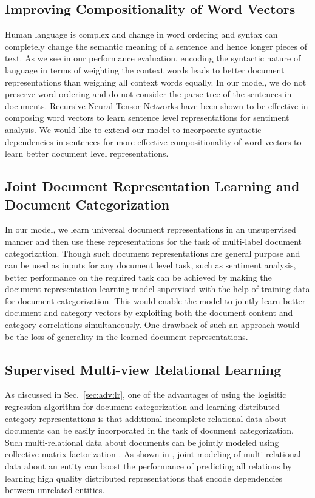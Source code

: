 \subsection{Improving Compositionality of Word Vectors}
Human language is complex and change in word ordering and syntax can completely change the semantic meaning of a sentence and hence longer pieces of text. 
As we see in our performance evaluation, encoding the syntactic nature of language in terms of weighting the context words leads to better document representations than weighing all context words equally. 
In our model, we do not preserve word ordering and do not consider the parse tree of the sentences in documents. 
Recursive Neural Tensor Networks \citep{socher2013recursive} have been shown to be effective in composing word vectors to learn sentence level representations for sentiment analysis. 
We would like to extend our model to incorporate syntactic dependencies in sentences for more effective compositionality of word vectors to learn better document level representations.

\subsection{Joint Document Representation Learning and Document Categorization}
In our model, we learn universal document representations in an unsupervised manner and then use these representations for the task of multi-label document categorization. 
Though such document representations are general purpose and can be used as inputs for any document level task, such as sentiment analysis, better performance on the required task can be achieved by making the document representation learning model supervised with the help of training data for document categorization. 
This would enable the model to jointly learn better document and category vectors by exploiting both the document content and category correlations simultaneously.
One drawback of such an approach would be the loss of generality in the learned document representations.

\subsection{Supervised Multi-view Relational Learning}
As discussed in Sec.~\ref{sec:adv:lr}, one of the advantages of using the logisitic regression algorithm for document categorization and learning distributed category representations is that additional incomplete-relational data about documents can be easily incorporated in the task of document categorization. Such multi-relational data about documents can be jointly modeled using collective matrix factorization \cite{singh2008relational}. 
As shown in \citet{gupta2015collectively}, joint modeling of multi-relational data about an entity can boost the performance of predicting all relations by learning high quality distributed representations that encode dependencies between unrelated entities. 
